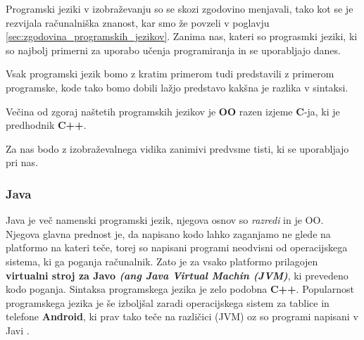 Programski jeziki v izobraževanju so se skozi zgodovino menjavali,
tako kot se je rezvijala računalniška znanost, kar smo že povzeli v
poglavju \ref{sec:zgodovina_programskih_jezikov}. Zanima nas, kateri so
prograsmki jeziki, ki so najbolj primerni za uporabo učenja
programiranja in se uporabljajo danes.

Vsak programski jezik bomo z kratim primerom tudi predstavili z
primerom programske, kode tako bomo dobili lažjo predstavo kakšna je
razlika v sintaksi.

Večina od zgoraj naštetih programskih jezikov je \textbf{OO} razen
izjeme \textbf{C}-ja, ki je predhodnik \textbf{C++}.




Za nas bodo z izobraževalnega vidika zanimivi predvsme tisti, ki se
uporabljajo pri nas.

\subsubsection{Java}
\label{sec:pj:JAVA}

Java je več namenski programski jezik, njegova osnov so \emph{razredi}
in je OO. Njegova glavna prednost je, da napisano kodo lahko zaganjamo
ne glede na platformo na kateri teče, torej so napisani programi
neodvisni od operacijskega sistema, ki ga poganja računalnik. Zato je
za vsako platformo prilagojen \textbf{virtualni stroj za Javo
  \emph{(ang Java Virtual Machin (JVM)}}, ki prevedeno kodo
poganja. Sintaksa programskega jezika je zelo podobna
\textbf{C++}. Popularnost programskega jezika je še izboljšal zaradi
operacijskega sistem za tablice in telefone \textbf{Android}, ki prav
tako teče na različici (JVM) oz so programi napisani v Javi
\cite{wiki:java}.

